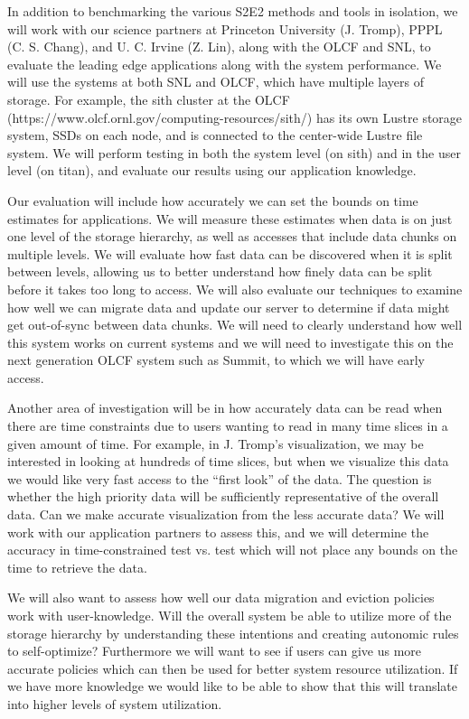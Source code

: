 In addition to benchmarking the various S2E2 methods and tools in isolation,
we will work with our science partners at Princeton University (J. Tromp),
PPPL (C. S. Chang), and U. C. Irvine (Z. Lin), along with the OLCF and SNL,
to evaluate the leading edge applications along with the system performance.
We will use the systems at both SNL and OLCF, which have multiple layers of
storage. For example, the sith cluster at the OLCF
(https://www.olcf.ornl.gov/computing-resources/sith/) has its own Lustre
storage system, SSDs on each node, and is connected to the center-wide Lustre
file system. We will perform testing in both the system level (on sith) and in
the user level (on titan), and evaluate our results using our application
knowledge.

Our evaluation will include how accurately we can set the bounds on
time estimates for applications. We will measure these estimates when data
is on just one level of the storage hierarchy, as well as
accesses that include data chunks on multiple levels.
We will evaluate how fast data can be discovered
when it is split between levels, allowing us to better understand how
finely data can be split before it takes too long to access.
We will also evaluate our techniques to examine how well we can
migrate data and update our server to determine if data might get
out-of-sync between data chunks. We will need to clearly understand how well
this system works on current systems and we will need to investigate this on
the next generation OLCF system such as Summit, to which we will have early access.

Another area of investigation will be in how accurately data can be read 
when there are time constraints due to users wanting to read in many time
slices in a given amount of time. For example, in J. Tromp's visualization,
we may be interested in looking at hundreds of time slices, but when we visualize this data we
would like very fast access to the ``first look'' of the data. The question
is whether the high priority data will be sufficiently representative of the overall data. Can
we make accurate visualization from the less accurate data? We will work
with our application partners to assess this, and we will determine the
accuracy in time-constrained test vs. test which will not place any bounds
on the time to retrieve the data.

We will also want to assess how well our data migration and eviction
policies work with user-knowledge. Will the overall system be able to
utilize more of the storage hierarchy by understanding these intentions and
creating autonomic rules to self-optimize? Furthermore we will want to see
if users can give us more accurate policies which can then be used for
better system resource utilization. If we have more knowledge we would like
to be able to show that this will translate into higher levels of
system utilization.

